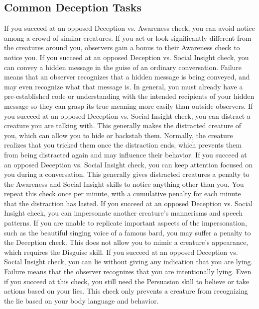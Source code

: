   \subsection{Common Deception Tasks}
     If you succeed at an opposed Deception vs. Awareness check, you can avoid notice among a crowd of similar creatures.
    If you act or look significantly different from the creatures around you, observers gain a bonus to their Awareness check to notice you.
     If you succeed at an opposed Deception vs. Social Insight check, you can convey a hidden message in the guise of an ordinary conversation.
    Failure means that an observer recognizes that a hidden message is being conveyed, and may even recognize what that message is.
    In general, you must already have a pre-established code or understanding with the intended recipients of your hidden message so they can grasp its true meaning more easily than outside observers.
     If you succeed at an opposed Deception vs. Social Insight check, you can distract a creature you are talking with.
    This generally makes the distracted creature \briefly \partiallyunaware of you, which can allow you to hide or backstab them.
    Normally, the creature realizes that you tricked them once the distraction ends, which prevents them from being distracted again and may influence their behavior.
     If you succeed at an opposed Deception vs. Social Insight check, you can keep attention focused on you during a conversation.
    This generally gives distracted creatures a  penalty to the Awareness and Social Insight skills to notice anything other than you.
    You repeat this check once per minute, with a cumulative  penalty for each minute that the distraction has lasted.
     If you succeed at an opposed Deception vs. Social Insight check, you can impersonate another creature's mannerisms and speech patterns.
    If you are unable to replicate important aspects of the impersonation, such as the beautiful singing voice of a famous bard, you may suffer a penalty to the Deception check.
    This does not allow you to mimic a creature's appearance, which requires the Disguise skill.
     If you succeed at an opposed Deception vs. Social Insight check, you can lie without giving any indication that you are lying.
    Failure means that the observer recognizes that you are intentionally lying.
    Even if you succeed at this check, you still need the Persuasion skill to believe or take actions based on your lies.
    This check only prevents a creature from recognizing the lie based on your body language and behavior.

